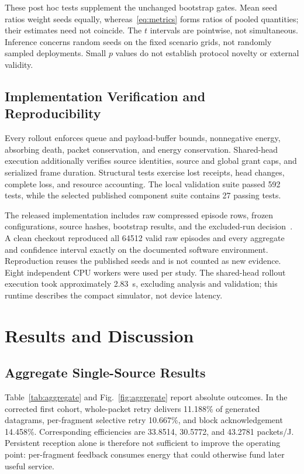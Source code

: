 \documentclass[journal,10pt]{IEEEtran}
\begin{document}
These post hoc tests supplement the unchanged bootstrap gates. Mean seed ratios weight seeds equally, whereas~\eqref{eq:metrics} forms ratios of pooled quantities; their estimates need not coincide. The $t$ intervals are pointwise, not simultaneous. Inference concerns random seeds on the fixed scenario grids, not randomly sampled deployments. Small $p$ values do not establish protocol novelty or external validity.

\subsection{Implementation Verification and Reproducibility}
Every rollout enforces queue and payload-buffer bounds, nonnegative energy, absorbing death, packet conservation, and energy conservation. Shared-head execution additionally verifies source identities, source and global grant caps, and serialized frame duration. Structural tests exercise lost receipts, head changes, complete loss, and resource accounting. The local validation suite passed 592 tests, while the selected published component suite contains 27 passing tests.

The released implementation includes raw compressed episode rows, frozen configurations, source hashes, bootstrap results, and the excluded-run decision~\cite{artifact}. A clean checkout reproduced all 64512 valid raw episodes and every aggregate and confidence interval exactly on the documented software environment. Reproduction reuses the published seeds and is not counted as new evidence. Eight independent CPU workers were used per study. The shared-head rollout execution took approximately 2.83~s, excluding analysis and validation; this runtime describes the compact simulator, not device latency.

\section{Results and Discussion}
\subsection{Aggregate Single-Source Results}
Table~\ref{tab:aggregate} and Fig.~\ref{fig:aggregate} report absolute outcomes. In the corrected first cohort, whole-packet retry delivers 11.188\% of generated datagrams, per-fragment selective retry 10.667\%, and block acknowledgement 14.458\%. Corresponding efficiencies are 33.8514, 30.5772, and 43.2781 packets/J. Persistent reception alone is therefore not sufficient to improve the operating point: per-fragment feedback consumes energy that could otherwise fund later useful service.
\end{document}
